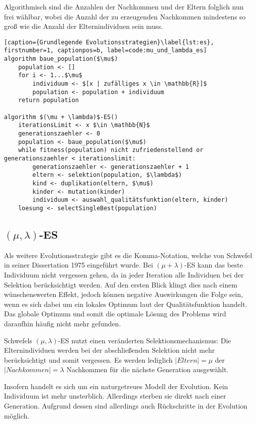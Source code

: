 Algorithmisch sind die Anzahlen der Nachkommen und der Eltern folglich nun frei wählbar, wobei die Anzahl der zu erzeugenden Nachkommen mindestens so groß wie die Anzahl der Elternindividuen sein muss.

\begin{lstlisting}[caption={Grundlegende Evolutionsstrategien}\label{lst:es}, firstnumber=1, captionpos=b, label=code:mu_und_lambda_es]
algorithm baue_population($\mu$)
	population <- []
	for i <- 1...$\mu$
		individuum <- $[x | zufälliges x \in \mathbb{R}]$
		population <- population + individuum
	return population

algorithm $(\mu + \lambda)$-ES()
	iterationsLimit <- x $\in \mathbb{N}$
	generationszaehler <- 0
	population <- baue_population($\mu$)
	while fitness(population) nicht zufriedenstellend or generationszaehler < iterationslimit:
		generationszaehler <- generationszaehler + 1
		eltern <- selektion(population, $\lambda$)
		kind <- duplikation(eltern, $\mu$)
		kinder <- mutation(kinder)
		individuum <- auswahl_qualitätsfunktion(eltern, kinder)
	loesung <- selectSingleBest(population)
\end{lstlisting}

\subsection{$(\mu, \lambda)$-ES}

Als weitere Evolutionsstrategie gibt es die Komma-Notation, welche von Schwefel in seiner Dissertation 1975 eingeführt wurde. Bei $(\mu + \lambda)$-ES kann das beste Individuum nicht vergessen gehen, da in jeder Iteration alle Individuen bei der Selektion berücksichtigt werden. Auf den ersten Blick klingt dies nach einem wünschenswerten Effekt, jedoch können negative Auswirkungen die Folge sein, wenn es sich dabei um ein lokales Optimum laut der Qualitätsfunktion handelt.
Das globale Optimum und somit die optimale Lösung des Problems wird daraufhin häufig nicht mehr gefunden.

Schwefels $(\mu, \lambda)$-ES nutzt einen veränderten Selektionsmechanismus:
Die Elternindividuen werden bei der abschließenden Selektion nicht mehr berücksichtigt und somit vergessen. Es werden lediglich $|Eltern| = \mu$ der $|Nachkommen| = \lambda$ Nachkommen für die nächste Generation ausgewählt.

Insofern handelt es sich um ein naturgetreues Modell der Evolution. Kein Individuum ist mehr unsterblich. Allerdings sterben sie direkt nach einer Generation. Aufgrund dessen sind allerdings auch Rückschritte in der Evolution möglich.

